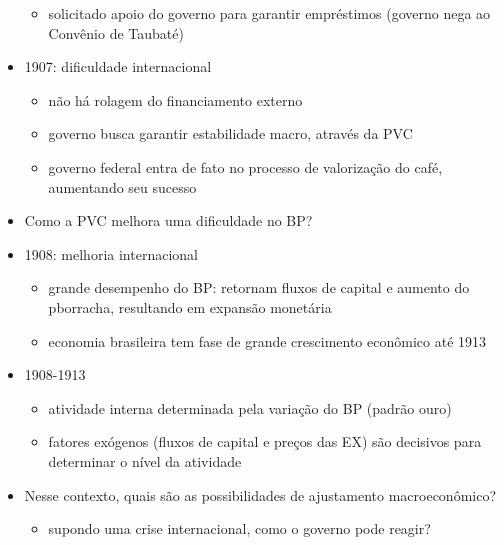 \documentclass[a4paper,12pt]{article}[abntex2]
\begin{document}
\begin{itemize}
\begin{itemize}
\end{itemize}
\begin{itemize}
    \item solicitado apoio do governo para garantir empréstimos (governo nega ao Convênio de Taubaté)
\end{itemize}
\item 1907: dificuldade internacional
\begin{itemize}
    \item  não há rolagem do financiamento externo
\end{itemize}
\begin{itemize}
    \item governo busca garantir estabilidade macro, através da PVC
\end{itemize}
\begin{itemize}
    \item  governo federal entra de fato no processo de valorização do café, aumentando seu sucesso
\end{itemize}
\item Como a PVC melhora uma dificuldade no BP?
\item 1908: melhoria internacional
\begin{itemize}
    \item grande desempenho do BP: retornam fluxos de capital e aumento do pborracha,
resultando em expansão monetária
\end{itemize}
\begin{itemize}
    \item economia brasileira tem fase de grande crescimento econômico até 1913
\end{itemize}
\item 1908-1913
\begin{itemize}
    \item atividade interna determinada pela variação do BP (padrão ouro)
\end{itemize}
\begin{itemize}
    \item  fatores exógenos (fluxos de capital e preços das EX) são decisivos para determinar o nível da atividade
\end{itemize}
\item  Nesse contexto, quais são as possibilidades de ajustamento macroeconômico?
\begin{itemize}
    \item  supondo uma crise internacional, como o governo pode reagir?
\end{itemize}

\end{itemize}
\end{document}
